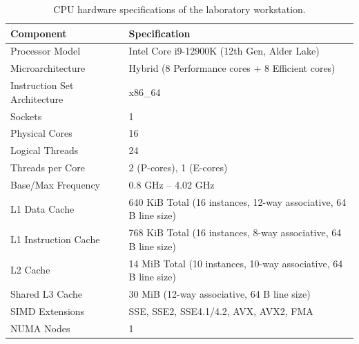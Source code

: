 \begin{table}[H]
\centering
\caption{CPU hardware specifications of the laboratory workstation.}
\label{tab:cpu_specs}
\begin{tabular}{ll}
\toprule
\textbf{Component} & \textbf{Specification} \\
\midrule
Processor Model & Intel Core i9-12900K (12th Gen, Alder Lake) \\
Microarchitecture & Hybrid (8 Performance cores + 8 Efficient cores) \\
Instruction Set Architecture & x86\_64 \\
Sockets & 1 \\
Physical Cores & 16 \\
Logical Threads & 24 \\
Threads per Core & 2 (P-cores), 1 (E-cores) \\
Base/Max Frequency & 0.8 GHz -- 4.02 GHz \\
L1 Data Cache & 640 KiB Total (16 instances, 12-way associative, 64 B line size) \\
L1 Instruction Cache & 768 KiB Total (16 instances, 8-way associative, 64 B line size) \\
L2 Cache & 14 MiB Total (10 instances, 10-way associative, 64 B line size) \\
Shared L3 Cache & 30 MiB (12-way associative, 64 B line size) \\
SIMD Extensions & SSE, SSE2, SSE4.1/4.2, AVX, AVX2, FMA \\
NUMA Nodes & 1 \\
\bottomrule
\end{tabular}
\end{table}